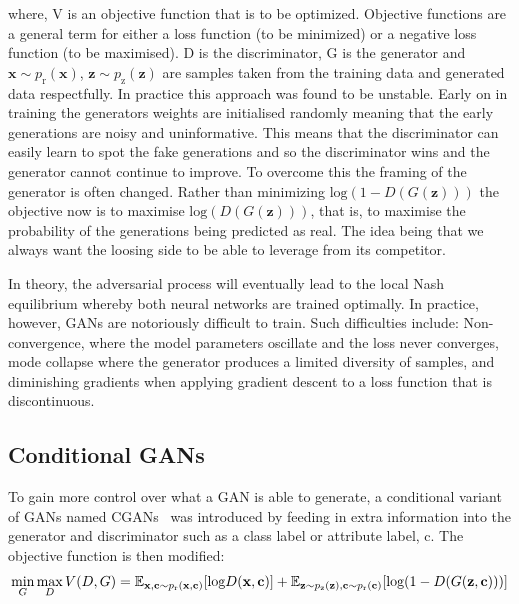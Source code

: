 \documentclass[12pt]{iopart}
\begin{document}
where, V is an objective function that is to be optimized. Objective functions are a general term for either a loss function (to be minimized) or a negative loss function (to be maximised). D is the discriminator, G is the generator and ${\mathbf{x} \sim p_{\text{r}}(\mathbf{x})}$, ${\mathbf{z} \sim p_{\text{z}}(\mathbf{z})}$ are samples taken from the training data and generated data respectfully. In practice this approach was found to be unstable. Early on in training the generators weights are initialised randomly meaning that the early generations are noisy and uninformative. This means that the discriminator can easily learn to spot the fake generations and so the discriminator wins and the generator cannot continue to improve. To overcome this the framing of the generator is often changed. Rather than minimizing $\text{log}(1-D(G(\mathbf{z})))$ the objective now is to maximise $\text{log}(D(G(\mathbf{z})))$, that is, to maximise the probability of the generations being predicted as real. The idea being that we always want the loosing side to be able to leverage from its competitor. 
%

%
In theory, the adversarial process will eventually lead to the local Nash
equilibrium \cite{Nash1950} whereby both neural networks are trained
optimally. In practice, however, \acp{GAN} are notoriously difficult
to train. Such difficulties include: Non-convergence, where the model
parameters oscillate and the loss never converges, mode collapse where the generator produces a
limited diversity of samples, and diminishing
gradients when applying gradient descent to a loss function that is discontinuous.

\subsection{Conditional GANs}

%
To gain more control over what a GAN is able to generate, a conditional variant of \acp{GAN} named \acp{CGAN}~\cite{cgan} was introduced by feeding in extra information into the generator and discriminator such as a class label or attribute label, c. The objective function is then modified:
\begin{equation}
\mathop{\text{min}}_{G}  \mathop{\text{max}}_{D} V(D,G) = \mathbb{E}_{\mathbf{x,c} \sim p_{\text{r}}(\mathbf{x,c})} [\text{log} D(\mathbf{x,c})] \\ + \mathbb{E}_{\mathbf{z} \sim p_{\text{z}}(\mathbf{z}),\mathbf{c} \sim p_{\text{r}}(\mathbf{c})} [\text{log}(1-D(G(\mathbf{z,c})))]
\label{equation:cGANloss}
\end{equation}
\end{document}
